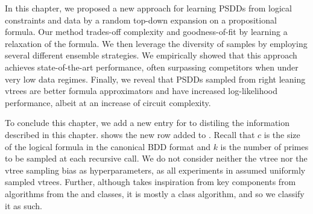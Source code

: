 In this chapter, we proposed a new approach for learning PSDDs from logical constraints and data by
a random top-down expansion on a propositional formula. Our method trades-off complexity and
goodness-of-fit by learning a relaxation of the formula. We then leverage the diversity of samples
by employing several different ensemble strategies. We empirically showed that this approach
achieves state-of-the-art performance, often surpassing competitors when under very low data
regimes. Finally, we reveal that PSDDs sampled from right leaning vtrees are better formula
approximators and have increased log-likelihood performance, albeit at an increase of circuit
complexity.

To conclude this chapter, we add a new entry for  to 
distiling the information described in this chapter.  shows the new
 row added to . Recall that $c$ is the size of the logical
formula in the canonical BDD format and $k$ is the number of primes to be sampled at each recursive
call. We do not consider neither the vtree nor the vtree sampling bias as hyperparameters, as all
experiments in  assumed uniformly sampled vtrees. Further, although
 takes inspiration from key components from algorithms from the \divclass{}
and \incrclass{} classes, it is mostly a \randclass{} class algorithm, and so we classify it as
such.

